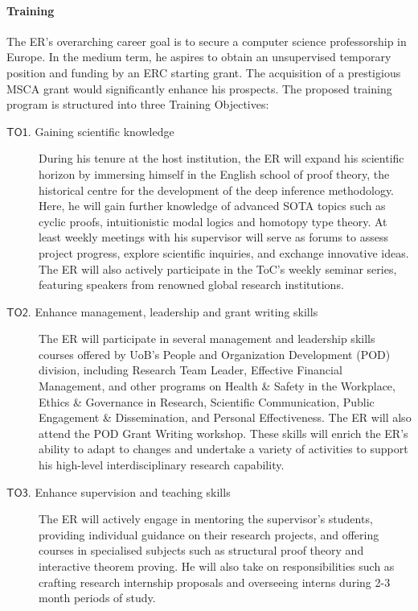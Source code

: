 \documentclass[12pt,draftproposal]{msca-pf}
\newcommand{\TO}[1]{$\mathsf{TO#1}$}
\begin{document}
\paragraph{Training}
The ER's overarching career goal is to secure a computer science professorship in Europe. In the
medium term, he aspires to obtain an unsupervised temporary position and funding by an ERC starting
grant. The acquisition of a prestigious MSCA grant would significantly enhance his prospects. The
proposed training program is structured into three Training Objectives:
\begin{description}
    \item[\TO{1}. Gaining scientific knowledge]
    During his tenure at the host institution, the ER will expand his scientific horizon by
    immersing himself in the English school of proof theory, the historical centre for the
    development of the deep inference methodology. Here, he will gain further knowledge of advanced
    SOTA topics such as cyclic proofs, intuitionistic modal logics and homotopy type
    theory. At least weekly meetings with his supervisor will serve as forums to assess project
    progress, explore scientific inquiries, and exchange innovative ideas. The ER will also actively
    participate in the ToC's weekly seminar series, featuring speakers from renowned global research
    institutions.

    \item[\TO{2}. Enhance management, leadership and grant writing skills]
    The ER will participate in several management and leadership skills courses offered by UoB's
    People and Organization Development (POD) division, including Research Team Leader, Effective
    Financial Management, and other programs on Health \& Safety in the Workplace, Ethics \&
    Governance in Research, Scientific Communication, Public Engagement \& Dissemination, and
    Personal Effectiveness. The ER will also attend the POD Grant Writing workshop. These skills
    will enrich the ER's ability to adapt to changes and undertake a variety of activities to
    support his high-level interdisciplinary research capability.

    \item[\TO{3}. Enhance supervision and teaching skills]
    The ER will actively engage in mentoring the supervisor's students, providing individual
    guidance on their research projects, and offering courses in specialised subjects such as
    structural proof theory and interactive theorem proving. He will also take on responsibilities
    such as crafting research internship proposals and overseeing interns during 2-3 month periods
    of study.

\end{description}
\end{document}
